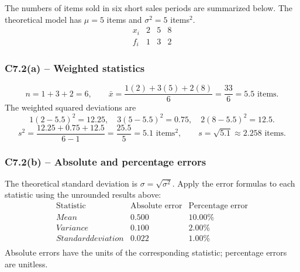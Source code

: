 {
The numbers of items sold in six short sales periods are summarized below.
The theoretical model has $\mu=5$ items and $\sigma^2=5$ items$^2$.
\[
\begin{array}{c|rrr}x_i&2&5&8\\\hline f_i&1&3&2\end{array}
\]
\label{sol:c7-2a}
\subsubsection*{C7.2(a) -- Weighted statistics }
\[
 n=1+3+2=6,\qquad\bar{x}=\frac{1(2)+3(5)+2(8)}{6}
 =\frac{33}{6}=5.5\text{ items}.
\]
The weighted squared deviations are
\[
1(2-5.5)^2=12.25,\quad 3(5-5.5)^2=0.75,\quad
2(8-5.5)^2=12.5.
\]
\[
s^2=\frac{12.25+0.75+12.5}{6-1}=\frac{25.5}{5}=5.1\text{ items}^2,
\qquad s=\sqrt{5.1}\approx2.258\text{ items}.
\]
\label{sol:c7-2b}
\subsubsection*{C7.2(b) -- Absolute and percentage errors }
The theoretical standard deviation is $\sigma=\sqrt{\sigma^2}$.
Apply the error formulas to each statistic using the unrounded results above:
\[
\begin{array}{l|rr}
\text{Statistic}&\text{Absolute error}&\text{Percentage error}\\\hline
Mean&0.500&10.00\%\\
Variance&0.100&2.00\%\\
Standard deviation&0.022&1.00\%\\
\end{array}
\]
Absolute errors have the units of the corresponding statistic; percentage errors are unitless.
\secInicio[sec:c7-2]
}

